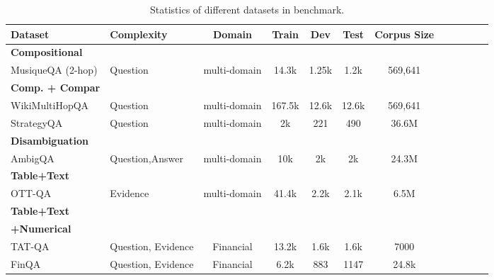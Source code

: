 \begin{table}[hbt!]
    \centering
    \small
    \begin{tabular}{p{2.9cm}
    p{2.8cm}cccccccp{0.3cm}p{0.3cm}p{0.3cm}}
    \toprule
     \textbf{Dataset}&{Complexity}& \multicolumn{1}{c}{Domain} &\multicolumn{1}{c}{Train} & \multicolumn{1}{c}{Dev} & \multicolumn{1}{c}{Test} & \multicolumn{1}{c}{Corpus Size} \\
     \midrule
\midrule
     \textbf{Compositional} &  &  &  & & &  \\
MusiqueQA (2-hop) & Question& multi-domain&   14.3k&1.25k & 1.2k & 569,641 \\
      \textbf{Comp. + Compar} &  &  &  & & &  \\
WikiMultiHopQA & Question & multi-domain  &167.5k &12.6k &12.6k & 569,641\\
StrategyQA & Question&multi-domain  &2k&221 &490 &36.6M \\
      \textbf{Disambiguation} &  &  &  & & &  \\
AmbigQA &Question,Answer &multi-domain  &10k &2k & 2k&24.3M 
 & \\

      \textbf{Table+Text} &  &  &  & &  &  \\
OTT-QA & Evidence&multi-domain  &41.4k &2.2k &2.1k &6.5M \\
     \textbf{Table+Text}   &   &   &   &  &  &   \\
    \textbf{+Numerical}  &   &   &   &  &  &    \\
TAT-QA &Question, Evidence & Financial   &13.2k &1.6k &1.6k &7000 \\
FinQA & Question, Evidence & Financial &6.2k &883 &1147 &24.8k \\

     \bottomrule
    \end{tabular}
    \caption{Statistics of different datasets in \name{} benchmark.}
    \label{tab:statistics}
\end{table}